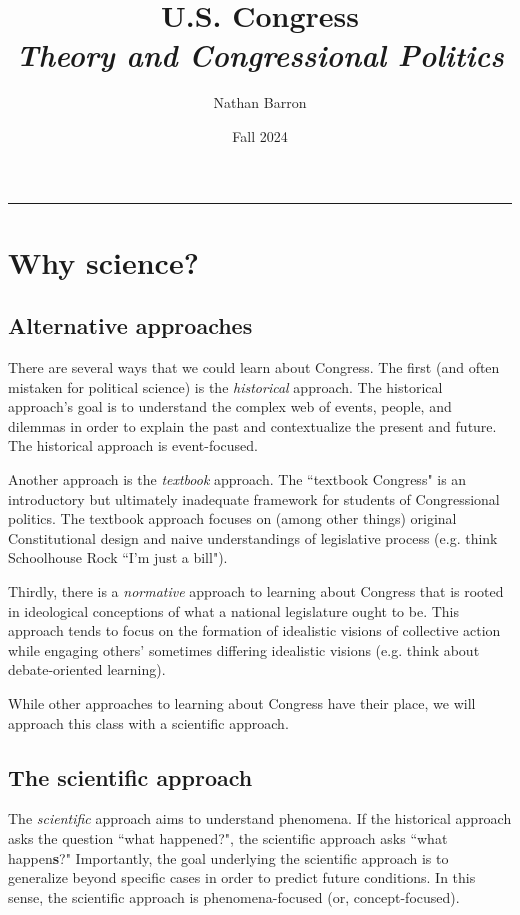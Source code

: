 \documentclass[10pt]{article}
\title{\textbf{U.S. Congress}\\\textit{Theory and Congressional Politics}}
\author{Nathan Barron}
\date{Fall 2024}
\begin{document}
\maketitle
\tableofcontents
\vspace{.25in}
\hrule
\vspace{.25in}

\section{Why science?}
\subsection{Alternative approaches}

There are several ways that we could learn about Congress. The first (and often mistaken for political science) is the \textit{historical} approach. The historical approach's goal is to understand the complex web of events, people, and dilemmas in order to explain the past and contextualize the present and future. The historical approach is event-focused. 

Another approach is the \textit{textbook} approach. The ``textbook Congress" is an introductory but ultimately inadequate framework for students of Congressional politics. The textbook approach focuses on (among other things) original Constitutional design and naive understandings of legislative process (e.g. think Schoolhouse Rock ``I'm just a bill"). 

Thirdly, there is a \textit{normative} approach to learning about Congress that is rooted in ideological conceptions of what a national legislature ought to be. This approach tends to focus on the formation of idealistic visions of collective action while engaging others' sometimes differing idealistic visions (e.g. think about debate-oriented learning). 

While other approaches to learning about Congress have their place, we will approach this class with a scientific approach.



\subsection{The scientific approach}
The \textit{scientific} approach aims to understand phenomena. If the historical approach asks the question ``what happened?", the scientific approach asks ``what happen\textbf{s}?" Importantly, the goal underlying the scientific approach is to generalize beyond specific cases in order to predict future conditions. In this sense, the scientific approach is phenomena-focused (or, concept-focused). 
\end{document}
